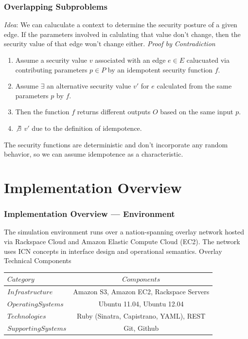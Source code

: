 \documentclass[t,handout, 10pt]{beamer}
\begin{document}
\begin{frame}
\frametitle{Overlapping Subproblems}
{\it Idea}: We can caluculate a context to determine the security posture of a given edge.  If the parameters involved in calulating that value don't change, then the security value of that edge won't change either.
\pause
\newline
\newline
{\it Proof by Contradiction}
{\small
\begin{enumerate}
\item Assume a security value $v$ associated with an edge $e \in E$ calucuated via contributing parameters $p \in P$ by an idempotent security function $f$.
\item Assume $\exists$ an alternative security value $v'$ for $e$ calculated from the same parameters $p$ by $f$.
\item Then the function $f$ returns different outputs $O$ based on the same input $p$.
\item $\not \exists$ $v'$ due to the definition of idempotence. 
\end{enumerate}
}
\color{blue}
{\small
The security functions are deterministic and don't incorporate any random behavior, so we can assume idempotence as a characteristic.
}
\color{black}
\end{frame}

\section{Implementation Overview}
\begin{frame}
\frametitle{Implementation Overview --- Environment}
The simulation environment runs over a nation-spanning overlay network hosted via Rackspace Cloud and Amazon Elastic Compute Cloud (EC2).  The network uses ICN concepts in interface design and operational semantics.
\pause
\newline
\newline
\centering
Overlay Technical Components
{\small
\begin{table}[tp] %
\centering %
\begin{tabular}{lc}
\toprule %
$Category$ 				& $Components$ 								\\\toprule %
$Infrastructure$ 		& Amazon S3, Amazon EC2, Rackspace Servers 	\\\midrule
$Operating Systems$		& Ubuntu 11.04, Ubuntu 12.04 				\\\midrule
$Technologies$			& Ruby (Sinatra, Capistrano, YAML), REST 	\\\midrule
$Supporting Systems$		& Git, Github 								\\\bottomrule
\end{tabular}
\end{table}
}
\end{frame}
\end{document}

